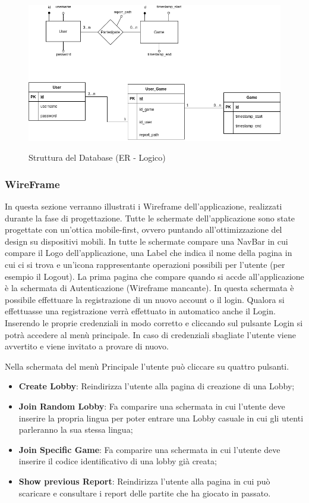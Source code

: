 \begin{figure}[H]
    \caption{Struttura del Database (ER - Logico)}
    \centering
    \includegraphics[width=150mm]{img/ingSoft/ER - Logic.png}
    \label{fig:db_struct}
\end{figure}

\subsubsection{WireFrame}
In questa sezione verranno illustrati i Wireframe dell'applicazione, realizzati durante la fase di progettazione.
Tutte le schermate dell'applicazione sono state progettate con un'ottica mobile-first, ovvero puntando all'ottimizzazione del design su dispositivi mobili.\newline
In tutte le schermate compare una NavBar in cui compare il Logo dell'applicazione, una Label che indica il nome della pagina in cui ci si trova e un'icona rappresentante operazioni possibili per l'utente (per esempio il Logout).\newline
La prima pagina che compare quando si accde all'applicazione è la schermata di Autenticazione (Wireframe mancante). In questa schermata è possibile effettuare la registrazione di un nuovo account o il login. Qualora si effettuasse una registrazione verrà effettuato in automatico anche il Login. Inserendo le proprie credenziali in modo corretto e cliccando sul pulsante Login si potrà accedere al menù principale.\newline
In caso di credenziali sbagliate l'utente viene avvertito e viene invitato a provare di nuovo.

Nella schermata del menù Principale l'utente può cliccare su quattro pulsanti.
\begin{itemize}
    \item \textbf{Create Lobby}: Reindirizza l'utente alla pagina di creazione di una Lobby;
    \item \textbf{Join Random Lobby}: Fa comparire una schermata in cui l'utente deve inserire la propria lingua per poter entrare una Lobby casuale in cui gli utenti parleranno la sua stessa lingua;
    \item \textbf{Join Specific Game}: Fa comparire una schermata in cui l'utente deve inserire il codice identificativo di una lobby già creata;
    \item \textbf{Show previous Report}: Reindirizza l'utente alla pagina in cui può scaricare e consultare i report delle partite che ha giocato in passato.
\end{itemize}

